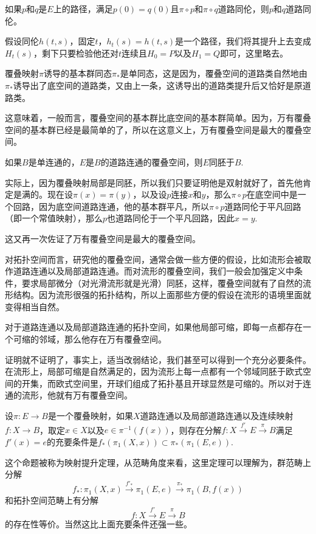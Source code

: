 \begin{pro}
如果$p$和$q$是$E$上的路径，满足$p(0)=q(0)$且$\pi\circ p$和$\pi\circ q$道路同伦，则$p$和$q$道路同伦。
\end{pro}

假设同伦$h(t,s)$，固定$t$，$h_t(s)=h(t,s)$是一个路径，我们将其提升上去变成$H_t(s)$，剩下只要检验他还对$t$连续且$H_0=P$以及$H_1=Q$即可，这里略去。

\para 覆叠映射$\pi$诱导的基本群同态$\pi_*$是单同态，这是因为，覆叠空间的道路类自然地由$\pi_*$诱导出了底空间的道路类，又由上一条，这诱导出的道路类提升后又恰好是原道路类。

这意味着，一般而言，覆叠空间的基本群比底空间的基本群简单。因为，万有覆叠空间的基本群已经是最简单的了，所以在这意义上，万有覆叠空间是最大的覆叠空间。

\para 如果$B$是单连通的，$E$是$B$的道路连通的覆叠空间，则$E$同胚于$B$.

实际上，因为覆叠映射局部是同胚，所以我们只要证明他是双射就好了，首先他肯定是满的。现在设$\pi(x)=\pi(y)$，以及设$p$连接$x$和$y$，那么$\pi\circ p$在底空间中是一个回路，因为底空间道路连通，他的基本群平凡，所以$\pi\circ p$道路同伦于平凡回路（即一个常值映射），那么$p$也道路同伦于一个平凡回路，因此$x=y$.

这又再一次佐证了万有覆叠空间是最大的覆叠空间。

\para 对拓扑空间而言，研究他的覆叠空间，通常会做一些方便的假设，比如流形会被取作道路连通以及局部道路连通。而对流形的覆叠空间，我们一般会加强定义中条件，要求局部微分（对光滑流形就是光滑）同胚，这样，覆叠空间就有了自然的流形结构。因为流形很强的拓扑结构，所以上面那些方便的假设在流形的语境里面就变得相当自然。

\begin{thm}
对于道路连通以及局部道路连通的拓扑空间，如果他局部可缩，即每一点都存在一个可缩的邻域，那么他存在万有覆叠空间。
\end{thm}

证明就不证明了，事实上，适当改弱结论，我们甚至可以得到一个充分必要条件。在流形上，局部可缩是自然满足的，因为流形上每一点都有一个邻域同胚于欧式空间的开集，而欧式空间里，开球们组成了拓扑基且开球显然是可缩的。所以对于连通的流形，他就有万有覆叠空间。

\para 设$\pi:E\to B$是一个覆叠映射，如果$X$道路连通以及局部道路连通以及连续映射$f:X\to B$，取定$x\in X$以及$e\in \pi^{-1}(f(x))$，则存在分解$f:X\xrightarrow{f'} E\xrightarrow{\pi} B$满足$f'(x)=e$的充要条件是$f_*(\pi_1(X,x))\subset \pi_*(\pi_1(E,e))$.

这个命题被称为映射提升定理，从范畴角度来看，这里定理可以理解为，群范畴上分解
\[f_*:\pi_1(X,x)\xrightarrow{f'_*} \pi_1(E,e)\xrightarrow{\pi_*} \pi_1(B,f(x))\]
和拓扑空间范畴上有分解
\[f:X\xrightarrow{f'} E\xrightarrow{\pi} B\]
的存在性等价。当然这比上面充要条件还强一些。

